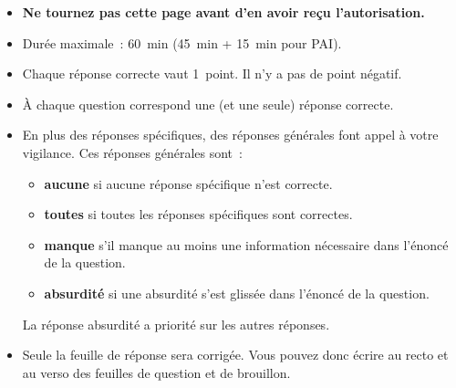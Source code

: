 %
\textbf{\thetitle{} \hfill{} \thesubtitle{}}

\vspace{1em}


\begin{itemize}
	\item \textbf{Ne tournez pas cette page avant d'en avoir reçu l'autorisation.}
	\item Durée maximale~: \qty{60}{\minute} (\qty{45}{\minute} + \qty{15}{\minute} pour PAI).
	\item Chaque réponse correcte vaut 1~point. Il n'y a pas de point négatif.
	\item À chaque question correspond une (et une seule) réponse correcte.
	\item En plus des réponses spécifiques, des réponses générales font appel à votre vigilance.
	      Ces réponses générales sont~:
	      \begin{itemize}[noitemsep]
		      \item \textbf{aucune} si aucune réponse spécifique n'est correcte.
		      \item \textbf{toutes} si toutes les réponses spécifiques sont correctes.
		      \item \textbf{manque} s'il manque au moins une information nécessaire dans l'énoncé de la question.
		      \item \textbf{absurdité} si une absurdité s'est glissée dans l'énoncé de la question.
	      \end{itemize}
	      La réponse absurdité a priorité sur les autres réponses.
	\item Seule la feuille de réponse sera corrigée.
	      Vous pouvez donc écrire au recto et au verso des feuilles de question et de brouillon.
\end{itemize}
